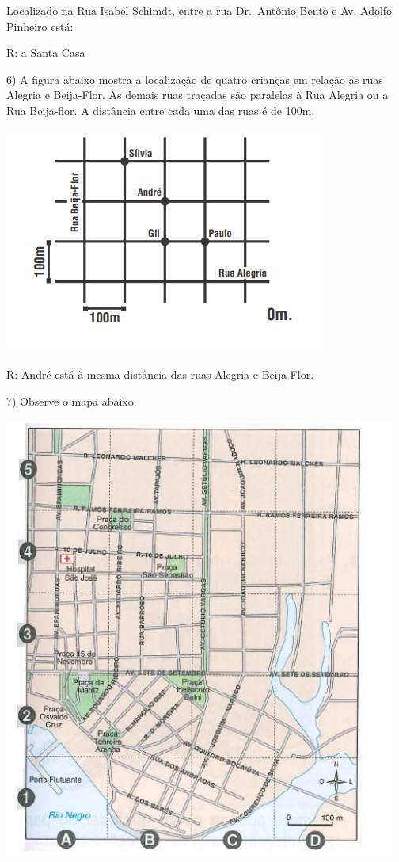 Localizado na Rua Isabel Schimdt, entre a rua Dr.~Antônio Bento e Av.
Adolfo Pinheiro está:

R: a Santa Casa

6) A figura abaixo mostra a localização de quatro crianças em relação às
ruas Alegria e Beija-Flor. As demais ruas traçadas são paralelas à Rua
Alegria ou a Rua Beija-flor. A distância entre cada uma das ruas é de
100m.

\includegraphics[width=4.19792in,height=2.93056in]{./imgSAEB_6_MAT/media/image69.png}

R: André está à mesma distância das ruas Alegria e Beija-Flor.

7) Observe o mapa abaixo.

\includegraphics[width=5.08333in,height=5.71875in]{./imgSAEB_6_MAT/media/image70.png}

